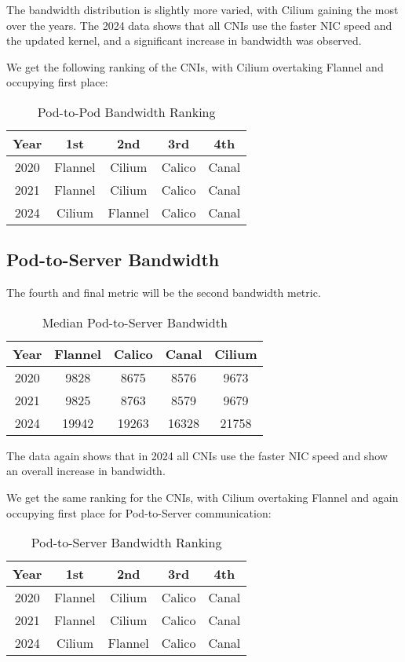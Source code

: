 The bandwidth distribution is slightly more varied, with Cilium gaining the most over the years. The 2024 data shows that all CNIs use the faster NIC speed and the updated kernel, and a significant increase in bandwidth was observed.

We get the following ranking of the CNIs, with Cilium overtaking Flannel and occupying first place:

\begin{table}[H]
\caption{Pod-to-Pod Bandwidth Ranking}
\begin{tabular}{|c | c | c | c | c|} 
 \hline
 Year & 1st & 2nd & 3rd & 4th \\
 \hline\hline
 2020 & Flannel & Cilium & Calico & Canal \\ 
 \hline
 2021 & Flannel & Cilium & Calico & Canal \\
 \hline
 2024 & Cilium & Flannel & Calico & Canal \\
 \hline
\end{tabular}
\label{tab:p2pbw-r}
\end{table}

\subsection{Pod-to-Server Bandwidth}

The fourth and final metric will be the second bandwidth metric.

\begin{table}[H]
\caption{Median Pod-to-Server Bandwidth}
\begin{tabular}{|c | c | c | c | c|} 
 \hline
 Year & Flannel & Calico & Canal & Cilium \\
 \hline\hline
 2020 & 9828 & 8675 & 8576 & 9673 \\ 
 \hline
 2021 & 9825 & 8763 & 8579 & 9679 \\
 \hline
 2024 & 19942 & 19263 & 16328 & 21758 \\
 \hline
\end{tabular}
\label{tab:p2ebw}
\end{table}

The data again shows that in 2024 all CNIs use the faster NIC speed and show an overall increase in bandwidth.

We get the same ranking for the CNIs, with Cilium overtaking Flannel and again occupying first place for Pod-to-Server communication:

\begin{table}[H]
\caption{Pod-to-Server Bandwidth Ranking}
\begin{tabular}{|c | c | c | c | c|} 
 \hline
 Year & 1st & 2nd & 3rd & 4th \\
 \hline\hline
 2020 & Flannel & Cilium & Calico & Canal \\ 
 \hline
 2021 & Flannel & Cilium & Calico & Canal \\
 \hline
 2024 & Cilium & Flannel & Calico & Canal \\
 \hline
\end{tabular}
\label{tab:p2ebw-r}
\end{table}

